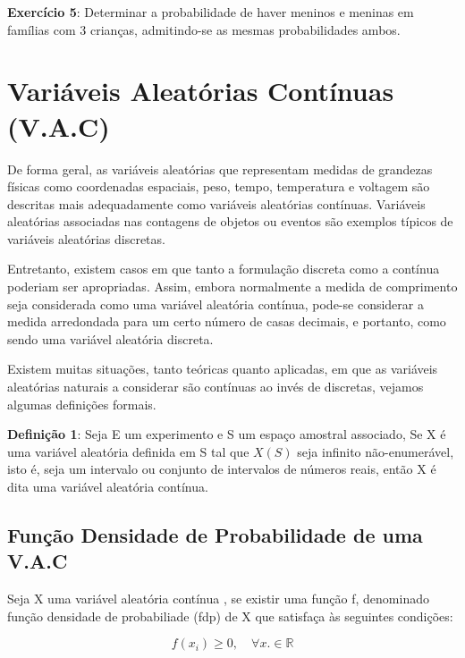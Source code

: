 \textbf{Exercício 5}: Determinar a probabilidade de haver meninos
e meninas em famílias com 3 crianças, admitindo-se as mesmas
probabilidades ambos.

\newpage

\section{Variáveis Aleatórias Contínuas (V.A.C)}

De forma geral, as variáveis aleatórias que representam medidas de
grandezas físicas como coordenadas espaciais, peso, tempo,
temperatura e voltagem são descritas mais adequadamente como
variáveis aleatórias contínuas. Variáveis aleatórias associadas
nas contagens de objetos ou eventos são exemplos típicos de
variáveis aleatórias discretas.\vskip0.3cm

Entretanto, existem casos em que tanto a formulação discreta como
a contínua poderiam ser apropriadas. Assim, embora normalmente a
medida de comprimento seja considerada como uma variável aleatória
contínua, pode-se considerar a medida arredondada para um certo
número de casas decimais, e portanto, como sendo uma variável
aleatória discreta.\vskip0.3cm


Existem muitas situações, tanto teóricas quanto aplicadas, em que
as variáveis aleatórias naturais a considerar são contínuas ao
invés de discretas, vejamos algumas definições formais.\vskip0.3cm


\textbf{Definição 1}: Seja E um experimento e S um espaço amostral
associado, Se X é uma variável aleatória definida em S tal que
$X(S)$ seja infinito não-enumerável, isto é, seja um intervalo ou
conjunto de intervalos de números reais, então X é dita uma
variável aleatória contínua.



\subsection{Função Densidade de Probabilidade de uma V.A.C}

Seja X uma variável aleatória contínua , se existir uma função f,
denominado função densidade de probabiliade (fdp) de X que
satisfaça às seguintes condições:


\begin{equation}\label{}
    f(x_{i}) \geq 0, \quad \forall x.\in \mathbb{R}
\end{equation}


